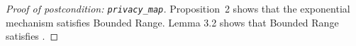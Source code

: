 \documentclass{article}
\begin{document}
\begin{proof}[Proof of postcondition: \texttt{privacy\_map}]

    \cite{Dong2019OptimalDP} Proposition~2 shows that the exponential mechanism satisfies Bounded Range.
    \cite{cesar2020bounding} Lemma 3.2 shows that Bounded Range satisfies .
\end{proof}



\end{document}

